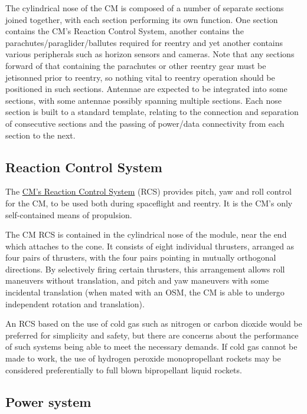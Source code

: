 \documentclass{report}
\begin{document}
The cylindrical nose of the CM is composed of a number of separate sections joined together, with each section performing its own function.  One section contains the CM's Reaction Control System, another contains the parachutes/paraglider/ballutes required for reentry and yet another contains various peripherals such as horizon sensors and cameras.  Note that any sections forward of that containing the parachutes or other reentry gear must be jetisonned prior to reentry, so nothing vital to reentry operation should be positioned in such sections.  Antennae are expected to be integrated into some sections, with some antennae possibly spanning multiple sections.  Each nose section is built to a standard template, relating to the connection and separation of consecutive sections and the passing of power/data connectivity from each section to the next.

\subsection{Reaction Control System}

The \href{http://cstart.org/wiki/CLLARE_CM_Reaction_Control_System}{CM's Reaction Control System} (RCS) provides pitch, yaw and roll control for the CM, to be used both during spaceflight and reentry. It is the CM's only self-contained means of propulsion.

The CM RCS is contained in the cylindrical nose of the module, near the end which attaches to the cone.  It consists of eight individual thrusters, arranged as four pairs of thrusters, with the four pairs pointing in mutually orthogonal directions.  By selectively firing certain thrusters, this arrangement allows roll maneuvers without translation, and pitch and yaw maneuvers with some incidental translation (when mated with an OSM, the CM is able to undergo independent rotation and translation).

An RCS based on the use of cold gas such as nitrogen or carbon dioxide would be preferred for simplicity and safety, but there are concerns about the performance of such systems being able to meet the necessary demands.  If cold gas cannot be made to work, the use of hydrogen peroxide monopropellant rockets may be considered preferentially to full blown bipropellant liquid rockets.

\subsection{Power system}
\end{document}
